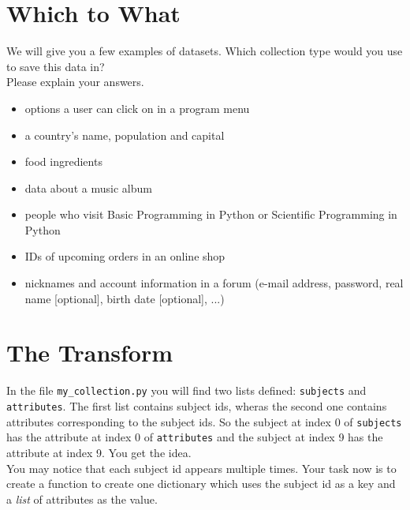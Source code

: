 \section{Which to What}
We will give you a few examples of datasets. Which collection type would you use to save this data in?\\
Please explain your answers.
\begin{itemize}
\item options a user can click on in a program menu
  \item a country's name, population and capital
  \item food ingredients
  \item data about a music album
  \item people who visit Basic Programming in Python or Scientific Programming in Python
  \item IDs of upcoming orders in an online shop
  \item nicknames and account information in a forum (e-mail address, password, real name [optional], birth date [optional], ...)
\end{itemize}

\section{The Transform}
In the file \texttt{my\_collection.py} you will find two lists defined: \texttt{subjects} and \texttt{attributes}. The first list contains subject ids, wheras the second one contains attributes corresponding to the subject ids. So the subject at index 0 of \texttt{subjects} has the attribute at index 0 of \texttt{attributes} and the subject at index 9 has the attribute at index 9. You get the idea.\\
You may notice that each subject id appears multiple times. Your task now is to create a function to create one dictionary which uses the subject id as a key and a \textit{list} of attributes as the value.


